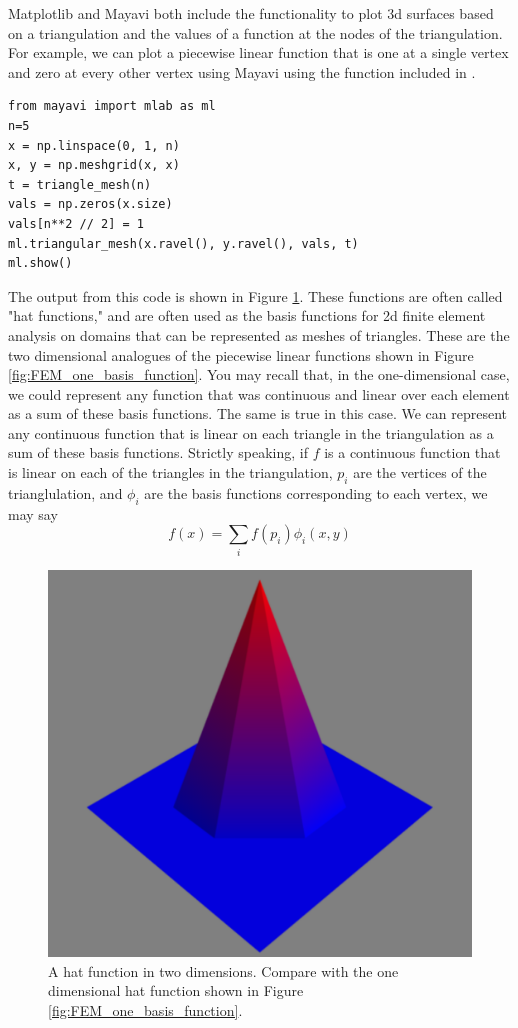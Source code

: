 Matplotlib and Mayavi both include the functionality to plot 3d surfaces based on a triangulation and the values of a function at the nodes of the triangulation.
For example, we can plot a piecewise linear function that is one at a single vertex and zero at every other vertex using Mayavi using the  function included in .
\begin{lstlisting}
from mayavi import mlab as ml
n=5
x = np.linspace(0, 1, n)
x, y = np.meshgrid(x, x)
t = triangle_mesh(n)
vals = np.zeros(x.size)
vals[n**2 // 2] = 1
ml.triangular_mesh(x.ravel(), y.ravel(), vals, t)
ml.show()
\end{lstlisting}
The output from this code is shown in Figure \ref{fig:fem2d_basis_functions}.
These functions are often called "hat functions," and are often used as the basis functions for 2d finite element analysis on domains that can be represented as meshes of triangles.
These are the two dimensional analogues of the piecewise linear functions shown in Figure \ref{fig:FEM_one_basis_function}.
You may recall that, in the one-dimensional case, we could represent any function that was continuous and linear over each element as a sum of these basis functions.
The same is true in this case.
We can represent any continuous function that is linear on each triangle in the triangulation as a sum of these basis functions.
Strictly speaking, if $f$ is a continuous function that is linear on each of the triangles in the triangulation, $p_i$ are the vertices of the trianglulation, and $\phi_i$ are the basis functions corresponding to each vertex, we may say
\[f(x) = \sum_{i} f(p_i) \phi_i(x, y)\]

\begin{figure}
\includegraphics[width=\textwidth]{hat_function.pdf}
\caption{A hat function in two dimensions. Compare with the one dimensional hat function shown in Figure \ref{fig:FEM_one_basis_function}.}
\label{fig:fem2d_basis_functions}
\end{figure}

